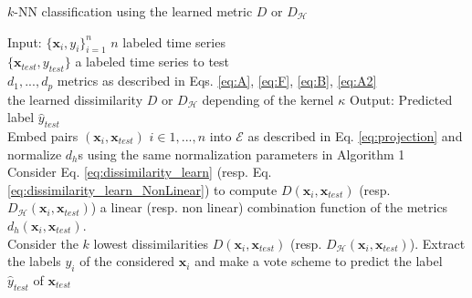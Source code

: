\begin{algorithm}[h!]
	\begin{algorithmic}[1]
		\caption{$k$-NN classification using the learned metric $D$ or $D_{\mathcal{H}}$}
		\STATE Input:  
		$\{\textbf{x}_i, y_i\}_{i=1}^n$ $n$ labeled time series \\
		\hspace{1.1cm} $\{\textbf{x}_{test}, y_{test}\}$ a labeled time series to test \\
		\hspace{1.1cm} $d_1, ...,d_p$  metrics as described in Eqs. \ref{eq:A}, \ref{eq:F}, \ref{eq:B}, \ref{eq:A2} \\
		\hspace{1.1cm} the learned dissimilarity $D$ or $D_{\mathcal{H}}$ depending of the kernel $\kappa$
		\STATE Output: Predicted label $\hat{y}_{test}$
		 \\   
		Embed pairs $(\textbf{x}_i,\textbf{x}_{test})$ $i\in {1,...,n}$ into $\mathcal{E}$ as described in Eq. \ref{eq:projection} and normalize $d_h$s using the same normalization parameters in Algorithm 1
		 \\ 
		Consider Eq. \ref{eq:dissimilarity_learn} (resp. Eq. \ref{eq:dissimilarity_learn_NonLinear}) to compute $D(\textbf{x}_i,\textbf{x}_{test})$ (resp. $D_{\mathcal{H}}(\textbf{x}_i,\textbf{x}_{test})$) a linear (resp. non linear) combination function of the metrics $d_h(\textbf{x}_i,\textbf{x}_{test})$.
		 \\
		Consider the $k$ lowest dissimilarities $D(\textbf{x}_i,\textbf{x}_{test})$ (resp. $D_{\mathcal{H}}(\textbf{x}_i,\textbf{x}_{test})$). Extract the labels $y_i$ of the considered $\textbf{x}_i$ and make a vote scheme to predict the label $\hat{y}_{test}$ of $\textbf{x}_{test}$
	\end{algorithmic}
\end{algorithm}


